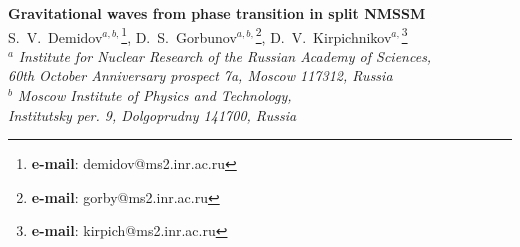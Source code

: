 \documentclass[12pt]{article}
\begin{document}
\begin{center}

    {\Large\bf Gravitational waves  from phase transition 
    in split NMSSM}
    \\
    \vspace{0.8cm}
    \vspace{0.3cm}
    S.~V.~Demidov$^{a,b,}$\footnote{{\bf e-mail}: demidov@ms2.inr.ac.ru}, 
    D.~S.~Gorbunov$^{a,b,}$\footnote{{\bf e-mail}: gorby@ms2.inr.ac.ru},
    D.~V.~Kirpichnikov$^{a,}$\footnote{{\bf e-mail}: kirpich@ms2.inr.ac.ru}
    \\
    
    $^a${\small{\em 
        Institute for Nuclear Research of the Russian Academy of Sciences, }}\\
      {\small{\em
          60th October Anniversary prospect 7a, Moscow 117312, Russia
      }
      }
      \\
$^{b}${\small{\em
Moscow Institute of Physics and Technology,
}}\\
{\small{\em
Institutsky per. 9, 
  Dolgoprudny 141700, Russia
}}\\
  \end{center}
  \begin{abstract}
We discuss gravitational wave signal from the strongly first order electroweak
phase transition in the split NMSSM. We find that for sets of
parameters predicting successful electroweak baryogenesis the gravitational wave
signal can be within the reach of future experiments LISA, BBO and
Ultimate DECIGO.
  \end{abstract}
\end{document}
